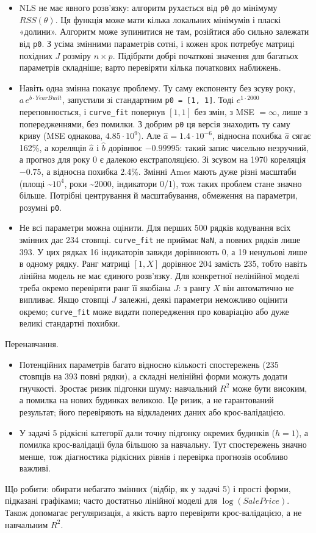 \begin{itemize}
\item
  NLS не має явного розв'язку: алгоритм рухається від \texttt{p0} до
  мінімуму \(RSS(\theta)\). Ця функція може мати кілька локальних
  мінімумів і пласкі «долини». Алгоритм може зупинитися не там,
  розійтися або сильно залежати від \texttt{p0}. З усіма змінними
  параметрів сотні, і кожен крок потребує матриці похідних \(J\) розміру
  \(n\times p\). Підібрати добрі початкові значення для багатьох
  параметрів складніше; варто перевіряти кілька початкових наближень.
\item
  Навіть одна змінна показує проблему. Ту саму експоненту без зсуву
  року, \(a\,e^{b\cdot YearBuilt}\), запустили зі стандартним
  \texttt{p0\ =\ {[}1,\ 1{]}}. Тоді \(e^{1\cdot2000}\) переповнюється, і
  \texttt{curve\_fit} повернув \([1,1]\) без змін, з MSE \(=\infty\),
  лише з попередженнями, без помилки. З добрим \texttt{p0} ця версія
  знаходить ту саму криву (MSE однакова, \(4.85\cdot10^9\)). Але
  \(\widehat a=1.4\cdot10^{-6}\), відносна похибка \(\widehat a\) сягає
  162\%, а кореляція \(\widehat a\) і \(\widehat b\) дорівнює
  \(-0.99995\): такий запис чисельно незручний, а прогноз для року 0 є
  далекою екстраполяцією. Зі зсувом на 1970 кореляція \(-0.75\), а
  відносна похибка 2.4\%. Змінні Ames мають дуже різні масштаби (площі
  \textasciitilde{}\(10^4\), роки \textasciitilde2000, індикатори 0/1),
  тож таких проблем стане значно більше. Потрібні центрування й
  масштабування, обмеження на параметри, розумні \texttt{p0}.
\item
  Не всі параметри можна оцінити. Для перших 500 рядків кодування всіх
  змінних дає 234 стовпці. \texttt{curve\_fit} не приймає \texttt{NaN},
  а повних рядків лише 393. У цих рядках 16 індикаторів завжди
  дорівнюють 0, а 19 ненульові лише в одному рядку. Ранг матриці
  \([1, X]\) дорівнює 204 замість 235, тобто навіть лінійна модель не
  має єдиного розв'язку. Для конкретної нелінійної моделі треба окремо
  перевіряти ранг її якобіана \(J\): з рангу \(X\) він автоматично не
  випливає. Якщо стовпці \(J\) залежні, деякі параметри неможливо
  оцінити окремо; \texttt{curve\_fit} може видати попередження про
  коваріацію або дуже великі стандартні похибки.
\end{itemize}

Перенавчання.

\begin{itemize}
\item
  Потенційних параметрів багато відносно кількості спостережень (235
  стовпців на 393 повні рядки), а складні нелінійні форми можуть додати
  гнучкості. Зростає ризик підгонки шуму: навчальний \(R^2\) може бути
  високим, а помилка на нових будинках великою. Це ризик, а не
  гарантований результат; його перевіряють на відкладених даних або
  крос-валідацією.
\item
  У задачі 5 рідкісні категорії дали точну підгонку окремих будинків
  (\(h=1\)), а помилка крос-валідації була більшою за навчальну. Тут
  спостережень значно менше, тож діагностика рідкісних рівнів і
  перевірка прогнозів особливо важливі.
\end{itemize}

Що робити: обирати небагато змінних (відбір, як у задачі 5) і прості
форми, підказані графіками; часто достатньо лінійної моделі для
\(\log(SalePrice)\). Також допомагає регуляризація, а якість варто
перевіряти крос-валідацією, а не навчальним \(R^2\).

